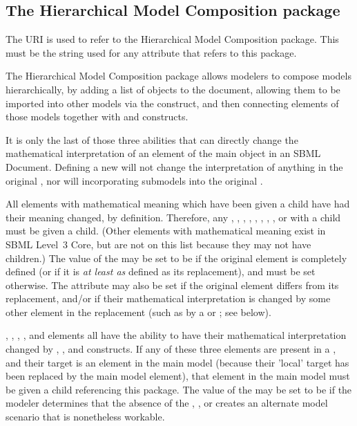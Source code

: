 \subsection{The Hierarchical Model Composition package}

The URI  is used to refer to the Hierarchical Model Composition package.  This must be the string used for any  attribute that refers to this package.

The Hierarchical Model Composition package allows modelers to compose models hierarchically, by adding a list of \Model objects to the document, allowing them to be imported into other models via the \Submodel construct, and then connecting elements of those models together with \ReplacedElement and \ReplacedBy constructs.

It is only the last of those three abilities that can directly change the mathematical interpretation of an element of the main \Model object in an SBML Document.  Defining a new \Model will not change the interpretation of anything in the original \Model, nor will incorporating submodels into the original \Model.

All elements with mathematical meaning which have been given a \ReplacedBy child have had their meaning changed, by definition.  Therefore, any \Compartment, \Parameter, \Reaction, \Species, \Constraint, \Event, \FunctionDefinition, \InitialAssignment, or \Rule with a \ReplacedBy child must be given a \ChangedMath child.  (Other elements with mathematical meaning exist in SBML Level~3 Core, but are not on this list because they may not have \ReplacedBy children.)  The value of the  may be set to be  if the original element is completely defined (or if it is \emph{at least as} defined as its replacement), and must be set  otherwise.  The attribute may also be set  if the original element differs from its replacement, and/or if their mathematical interpretation is changed by some other element in the replacement (such as by a \Rule or \Reaction; see below).

\Compartment, \Parameter, \Reaction, \Species, and \SpeciesReference elements all have the ability to have their mathematical interpretation changed by \InitialAssignment, \Rule, and \Event constructs.  If any of these three elements are present in a \Submodel, and their target is an element in the main model (because their 'local' target has been replaced by the main model element), that element in the main model must be given a \ChangedMath child referencing this package.  The value of the  may be set to be  if the modeler determines that the absence of the \InitialAssignment, \Rule, or \Event creates an alternate model scenario that is nonetheless workable.

